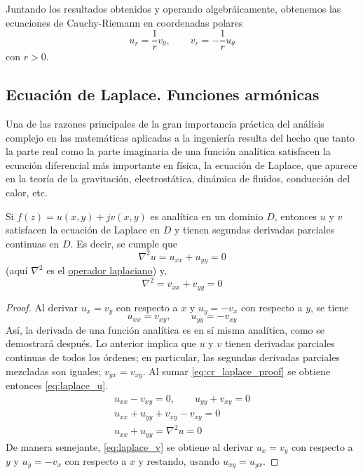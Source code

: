 Juntando los resultados obtenidos y operando algebráicamente, obtenemos las ecuaciones de Cauchy-Riemann en coordenadas polares
\begin{equation}
  u_r = \frac{1}{r}v_\theta, \qquad v_r =  -\frac{1}{r}u_\theta
\end{equation} 
con $r>0$.

\subsection{Ecuación de Laplace. Funciones armónicas}

Una de las razones principales de la gran importancia práctica del análisis complejo en las matemáticas aplicadas a la ingeniería resulta del hecho que tanto la parte real como la parte imaginaria de una función analítica satisfacen la ecuación diferencial más importante en física, la ecuación de Laplace, que aparece en la teoría de la gravitación, electrostática, dinámica de fluidos, conducción del calor, etc.

\begin{theorem}
  Si $f(z)=u(x,y)+jv(x,y)$ es analítica en un dominio $D$, entonces $u$ y $v$ satisfacen la ecuación de Laplace en $D$ y tienen segundas derivadas parciales continuas en $D$. Es decir, se cumple que
  \begin{equation}\label{eq:laplace_u}
    \nabla^2 u = u_{xx} + u_{yy} = 0
  \end{equation}
  (aquí $\nabla^2$ es el \href{https://en.wikipedia.org/wiki/Laplace_operator}{operador laplaciano}) y,
  \begin{equation}\label{eq:laplace_v}
    \nabla^2 = v_{xx} + v_{yy} = 0
  \end{equation}
\end{theorem}

\begin{proof}
  Al derivar $u_x = v_y$ con respecto a $x$ y $u_y=-v_x$ con respecto a $y$, se tiene
  \begin{equation}\label{eq:cr_laplace_proof}
    u_{xx}=v_{xy}, \qquad u_{yy} = -v_{xy}
  \end{equation}
  Así, la derivada de una función analítica es en sí misma analítica, como se demostrará después. Lo anterior implica que $u$ y $v$ tienen derivadas parciales continuas de todos los órdenes; en particular, las segundas derivadas parciales mezcladas son iguales; $v_{yx}= v_{xy}$. Al sumar \ref{eq:cr_laplace_proof} se obtiene entonces \ref{eq:laplace_u}.
  \begin{gather*}
    u_{xx}-v_{xy}=0, \qquad u_{yy}+v_{xy}=0 \\ 
    u_{xx}+u_{yy}+v_{xy}-v_{xy}=0 \\ 
    u_{xx}+u_{yy}=\nabla^2 u=0 
  \end{gather*}
  De manera semejante, \ref{eq:laplace_v} se obtiene al derivar $u_x=v_y$ con respecto a $y$ y $u_y=-v_x$ con respecto a $x$ y restando, usando $u_{xy}=u_{yx}$.
\end{proof}

